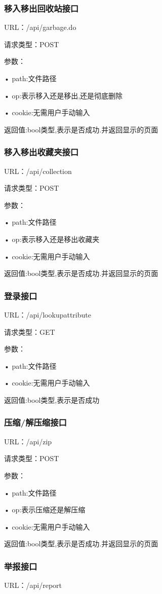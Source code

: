 \subsubsection{移入移出回收站接口}
URL：/api/garbage.do

请求类型：POST

参数：

• path:文件路径

• op:表示移入还是移出,还是彻底删除

• cookie:无需用户手动输入

返回值:bool类型,表示是否成功.并返回显示的页面

\subsubsection{移入移出收藏夹接口}
URL：/api/collection

请求类型：POST

参数：

• path:文件路径

• op:表示移入还是移出收藏夹

• cookie:无需用户手动输入

返回值:bool类型,表示是否成功.并返回显示的页面
 
\subsubsection{登录接口}
URL：/api/lookupattribute

请求类型：GET

参数：

• path:文件路径

• cookie:无需用户手动输入

返回值:bool类型,表示是否成功

\subsubsection{压缩/解压缩接口}
URL：/api/zip

请求类型：POST

参数： 

• path:文件路径

• op:表示压缩还是解压缩

• cookie:无需用户手动输入

返回值:bool类型,表示是否成功.并返回显示的页面

\subsubsection{举报接口}
URL：/api/report

